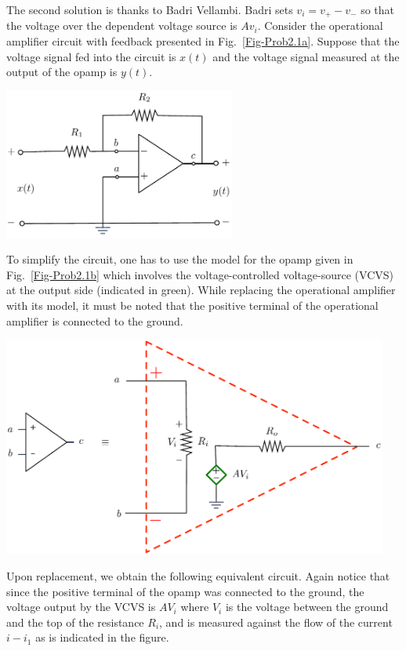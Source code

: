 \begin{excersizelist}
\begin{solution}
The second solution is thanks to Badri Vellambi.  Badri sets $v_i = v_+ - v_-$ so that the voltage over the dependent voltage source is $Av_i$.  Consider the operational amplifier circuit with feedback presented in Fig.~\ref{Fig-Prob2.1a}. Suppose that the voltage signal fed into the circuit is $x(t)$ and the voltage signal measured at the output of the opamp is $y(t)$. 

{
\centering
\captionsetup{type=figure}
\includegraphics[width=3in]{plots/multiplierbadri1.pdf}
 \label{Fig-Prob2.1a}
}

To simplify the circuit, one has to use the model for the opamp given in Fig.~\ref{Fig-Prob2.1b} which involves the voltage-controlled voltage-source (VCVS) at the output side (indicated in green).  While replacing the operational amplifier with its model, it must be noted that the positive terminal of the operational amplifier is connected to the ground.

{
\centering 
\captionsetup{type=figure}
\includegraphics[width=5in]{plots/multiplierbadri2.pdf}
 \label{Fig-Prob2.1b}
}

Upon replacement, we obtain the following equivalent circuit. Again notice that since the positive terminal of the opamp was connected to the ground, the voltage output by the VCVS is $AV_i$ where $V_i$ is the voltage between the ground and the top of the resistance $R_i$, and is measured against the flow of the current $i-i_1$ as is indicated in the figure.


\end{solution}
\end{excersizelist}
